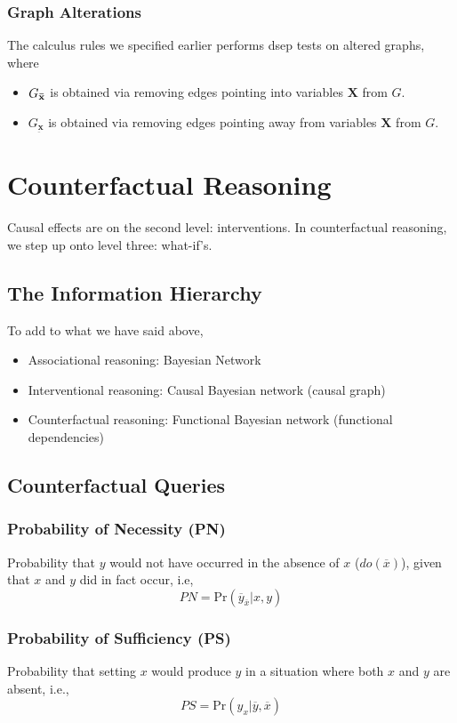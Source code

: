 \documentclass[11pt]{article}
\newcommand{\largeover}[1]{\mkern 1.5mu\overline{\mkern-1.5mu#1\mkern-1.5mu}\mkern 1.5mu}
\newcommand{\pr}{\mathrm{Pr}}
\begin{document}
\subsubsection{Graph Alterations}\label{sec:graph alteration} The calculus rules we specified earlier performs dsep tests on altered graphs, where
\begin{itemize}
	\item $G_{\largeover{\mathbf x}}$ is obtained via removing edges pointing into variables $\mathbf X$ from $G$.
	\item $G_{\underbar{\mathbf x}}$ is obtained via removing edges pointing away from variables $\mathbf X$ from $G$.
\end{itemize}

\section{Counterfactual Reasoning}
Causal effects are on the second level: interventions. In counterfactual reasoning, we step up onto level three: what-if's. 

\subsection{The Information Hierarchy}
To add to what we have said above, 
\begin{itemize}
	\item Associational reasoning: Bayesian Network
	\item Interventional reasoning: Causal Bayesian network (causal graph)
	\item Counterfactual reasoning: Functional Bayesian network (functional dependencies)
\end{itemize}

\subsection{Counterfactual Queries}
\subsubsection{Probability of Necessity (PN)}
Probability that $y$ would not have occurred in the absence of $x$ ($do(\overbar x)$), given that $x$ and $y$ did in fact occur, i.e, 
\begin{equation}
	PN = \pr (\overbar y_{\overbar x} | x, y) 
\end{equation}

\subsubsection{Probability of Sufficiency (PS)}
Probability that setting $x$ would produce $y$ in a situation where both $x$ and $y$ are absent, i.e., 
\begin{equation}
	PS = \pr (y_x | \overbar y, \overbar x)
\end{equation}
\end{document}
